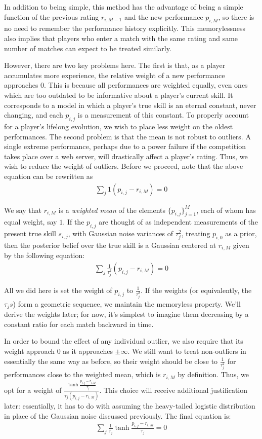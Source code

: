 \documentclass{article}
\begin{document}
In addition to being simple, this method has the advantage of being a simple function of the previous rating $r_{i,M-1}$ and the new performance $p_{i,M}$, so there is no need to remember the performance history explicitly. This memorylessness also implies that players who enter a match with the same rating and same number of matches can expect to be treated similarly.

However, there are two key problems here. The first is that, as a player accumulates more experience, the relative weight of a new performance approaches $0$. This is because all performances are weighted equally, even ones which are too outdated to be informative about a player's current skill. It corresponds to a model in which a player's true skill is an eternal constant, never changing, and each $p_{i,j}$ is a measurement of this constant. To properly account for a player's lifelong evolution, we wish to place less weight on the oldest performances. The second problem is that the mean is not robust to outliers. A single extreme performance, perhaps due to a power failure if the competition takes place over a web server, will drastically affect a player's rating. Thus, we wish to reduce the weight of outliers. Before we proceed, note that the above equation can be rewritten as
\begin{align}
\sum_j 1 (p_{i,j} - r_{i,M}) = 0
\end{align}

We say that $r_{i,M}$ is a \emph{weighted mean} of the elements $\{p_{i,j}\}_{j=1}^{M}$, each of whom has equal weight, say $1$. If the $p_{i,j}$ are thought of as independent measurements of the present true skill $s_{i,j}$, with Gaussian noise variances of $\tau_j^2$, treating $p_{i,0}$ as a prior, then the posterior belief over the true skill is a Gaussian centered at $r_{i,M}$ given by the following equation:
\begin{align}
\sum_j \frac{1}{\tau_j^2} (p_{i,j} - r_{i,M}) = 0
\end{align}

All we did here is set the weight of $p_{i,j}$ to $\frac{1}{\tau_j^2}$. If the weights (or equivalently, the $\tau_js$) form a geometric sequence, we maintain the memoryless property. We'll derive the weights later; for now, it's simplest to imagine them decreasing by a constant ratio for each match backward in time.

In order to bound the effect of any individual outlier, we also require that its weight approach $0$ as it approaches $\pm\infty$. We still want to treat non-outliers in essentially the same way as before, so their weight should be close to $\frac{1}{\tau_j^2}$ for performances close to the weighted mean, which is $r_{i,M}$ by definition. Thus, we opt for a weight of $\frac{\tanh\frac{p_{i,j} - r_{i,M}}{\tau_j}}{\tau_j(p_{i,j} - r_{i,M})}$. This choice will receive additional justification later: essentially, it has to do with assuming the heavy-tailed logistic distribution in place of the Gaussian noise discussed previously. The final equation is:
\begin{align}
\sum_j \frac {1}{\tau_j} \tanh\frac{p_{i,j} - r_{i,M}}{\tau_j} = 0
\end{align}
\end{document}
